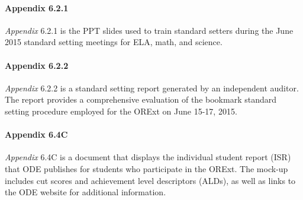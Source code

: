 \documentclass[]{article}
\let\oldparagraph\paragraph
\renewcommand{\paragraph}[1]{\oldparagraph{#1}\mbox{}}
\begin{document}
\paragraph{Appendix 6.2.1}\label{appendix-6.2.1}

\emph{Appendix} 6.2.1 is the PPT slides used to train standard setters
during the June 2015 standard setting meetings for ELA, math, and
science.

\paragraph{Appendix 6.2.2}\label{appendix-6.2.2}

\emph{Appendix} 6.2.2 is a standard setting report generated by an
independent auditor. The report provides a comprehensive evaluation of
the bookmark standard setting procedure employed for the ORExt on June
15-17, 2015.

\paragraph{Appendix 6.4C}\label{appendix-6.4c}

\emph{Appendix} 6.4C is a document that displays the individual student
report (ISR) that ODE publishes for students who participate in the
ORExt. The mock-up includes cut scores and achievement level descriptors
(ALDs), as well as links to the ODE website for additional information.
\end{document}
